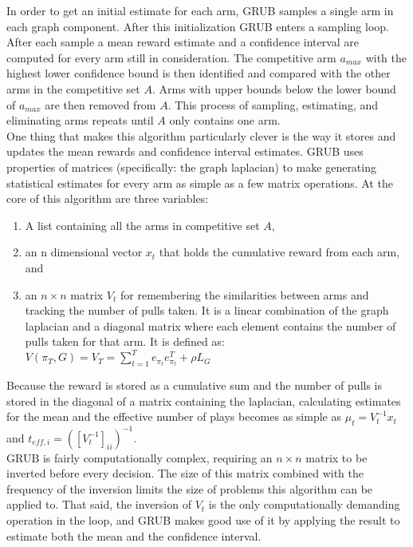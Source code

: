 \documentclass{article}[12pt]
\begin{document}
In order to get an initial estimate for each arm, GRUB samples a single arm in each graph component.
After this initialization GRUB enters a sampling loop.
After each sample a mean reward estimate and a confidence interval are computed for every arm still in consideration.
The competitive arm $a_{max}$ with the highest lower confidence bound is then identified and compared with the other arms in the competitive set $A$.
Arms with upper bounds below the lower bound of $a_{max}$ are then removed from $A$.
This process of sampling, estimating, and eliminating arms repeats until $A$ only contains one arm. \\


One thing that makes this algorithm particularly clever is the way it stores and updates the mean rewards and confidence interval estimates.
GRUB uses properties of matrices (specifically: the graph laplacian) to make generating statistical estimates for every arm as simple as a few matrix operations.
At the core of this algorithm are three variables:
\begin{enumerate}
    \item A list containing all the arms in competitive set $A$,
    \item an n dimensional vector $x_t$ that holds the cumulative reward from each arm, and
    \item an $n \times n$ matrix $V_t$ for remembering the similarities between arms and tracking the number of pulls taken.
    It is a linear combination of the graph laplacian and a diagonal matrix where each element contains the number of pulls taken for that arm.
        It is defined as: $ V(\pi_T, G) = V_T = \sum_{t=1}^T e_{\pi_t} e_{\pi_t}^T + \rho L_G $
 		
\end{enumerate}

Because the reward is stored as a cumulative sum and the number of pulls is stored in the diagonal of a matrix containing the laplacian,
calculating estimates for the mean and the effective number of plays becomes as simple as $\mu_t = V_t^{-1} x_t$ and $t_{eff,i} = \left( \left[ V_t^{-1} \right]_{ii} \right)^{-1}$. \\

GRUB is fairly computationally complex, requiring an $n \times n$ matrix to be inverted before every decision.
The size of this matrix combined with the frequency of the inversion limits the size of problems this algorithm can be applied to.
That said, the inversion of $V_t$ is the only computationally demanding operation in the loop,
and GRUB makes good use of it by applying the result to estimate both the mean and the confidence interval. \\
\end{document}

